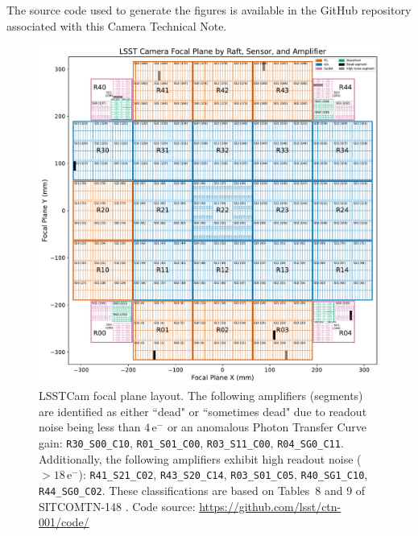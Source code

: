 \documentclass[OPS,authoryear,toc]{lsstdoc}
\begin{document}
The source code used to generate the figures is available in the GitHub repository associated with this Camera Technical Note.

\clearpage

\begin{figure}
  \centering
  \includegraphics[width=\textwidth]{figures/LSSTCam_focal_plane_CTN_001_FIG1.pdf}
  \caption{LSSTCam focal plane layout. The following amplifiers (segments) are identified as either ``dead" or ``sometimes dead" due to readout noise being less than $4\,\mathrm{e}^{-}$ or an anomalous Photon Transfer Curve gain: {\tt{R30\_S00\_C10}}, {\tt{R01\_S01\_C00}}, {\tt{R03\_S11\_C00}}, {\tt{R04\_SG0\_C11}}. Additionally, the following amplifiers exhibit high readout noise ($> 18\,\mathrm{e}^{-}$): {\tt{R41\_S21\_C02}}, {\tt{R43\_S20\_C14}}, {\tt{R03\_S01\_C05}}, {\tt{R40\_SG1\_C10}}, {\tt{R44\_SG0\_C02}}. These classifications are based on Tables~8 and 9 of SITCOMTN-148 \citep{utsumi25}. Code source: \url{https://github.com/lsst/ctn-001/code/}}
  \label{fig:focal_plane_1}
\end{figure}

\clearpage
\end{document}
